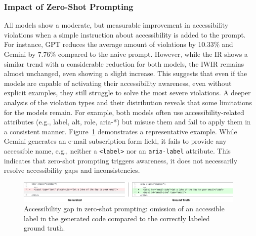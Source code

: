 \begingroup
    
\endgroup

\subsubsection{Impact of Zero-Shot Prompting}
All models show a moderate, but measurable improvement in accessibility 
violations when a simple instruction about accessibility is added to 
the prompt. For instance, GPT reduces the average amount of 
violations by 10.33\% and Gemini by 7.76\% compared to the 
naive prompt. However, while the IR shows a similar trend with 
a considerable reduction for both models, the IWIR remains almost 
unchanged, even showing a slight increase. This suggests that even 
if the models are capable of activating their accessibility 
awareness, even without explicit examples, they still struggle to 
solve the most severe violations.\newline
A deeper analysis of the violation types and their distribution 
reveals that some limitations for the models remain. For example,
both models often use accessibility-related attributes (e.g., 
label, alt, role, aria-*) but misuse them and fail to apply them 
in a consistent manner. Figure~\ref{fig:zero-shot-example} demonstrates
a representative example. While Gemini generates an e-mail 
subscription form field, it fails to provide any accessible name,
e.g., neither a \texttt{<label>} nor an \texttt{aria-label} attribute.
This indicates that zero-shot prompting triggers awareness, it 
does not necessarily resolve accessibility gaps and inconsistencies.

\enlargethispage{2\baselineskip}

\begin{figure}[htbp]
  \centering
  \includegraphics[width=1\linewidth]{figures/zeroshot-example.png}
  \caption{Accessibility gap in zero-shot prompting: omission of an accessible label in the generated code compared to the correctly labeled ground truth.}
  \label{fig:zero-shot-example} 
\end{figure}


